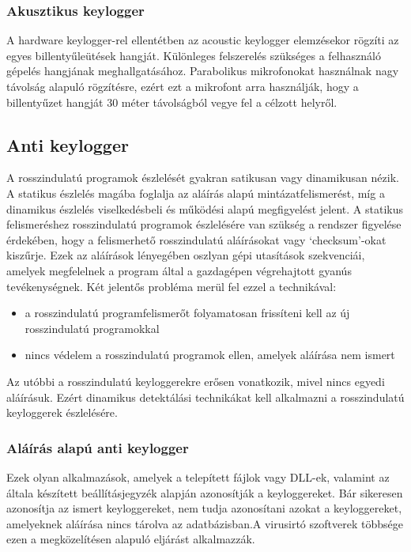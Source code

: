 \documentclass[a4paper, 11pt]{article}
\begin{document}
\subsubsection{Akusztikus keylogger}
\cite{ahmed2014survey} A hardware keylogger-rel ellentétben az acoustic keylogger elemzésekor rögzíti az egyes billentyűleütések hangját. Különleges felszerelés szükséges a felhasználó gépelés hangjának meghallgatásához. Parabolikus mikrofonokat használnak nagy távolság alapuló rögzítésre, ezért ezt a mikrofont arra használják, hogy a billentyűzet hangját 30 méter távolságból vegye fel a célzott helyről.

\subsection{Anti keylogger}
\cite{wood2010keyloggers} A rosszindulatú programok észlelését gyakran satikusan vagy dinamikusan nézik. A statikus észlelés magába foglalja az aláírás alapú mintázatfelismerést, míg a dinamikus észlelés viselkedésbeli és működési alapú megfigyelést jelent. A statikus felismeréshez rosszindulatú programok észlelésére van szükség a rendszer figyelése érdekében, hogy a felismerhető rosszindulatú aláírásokat vagy `checksum'-okat kiszűrje. Ezek az aláírások lényegében oszlyan gépi utasítások szekvenciái, amelyek megfelelnek a program által a gazdagépen végrehajtott gyanús tevékenységnek. Két jelentős probléma merül fel ezzel a technikával:
\begin{itemize}
\item a rosszindulatú programfelismerőt folyamatosan frissíteni kell az új rosszindulatú programokkal
\item nincs védelem a rosszindulatú programok ellen, amelyek aláírása nem ismert
\end{itemize}
Az utóbbi a rosszindulatú keyloggerekre erősen vonatkozik, mivel nincs egyedi aláírásuk. Ezért dinamikus detektálási technikákat kell alkalmazni a rosszindulatú keyloggerek észlelésére.

\subsubsection{Aláírás alapú anti keylogger}
\cite{tuli2013system} Ezek olyan alkalmazások, amelyek a telepített fájlok vagy DLL-ek, valamint az általa készített beállításjegyzék alapján azonosítják a keyloggereket. Bár sikeresen azonosítja az ismert keyloggereket, nem tudja azonosítani azokat a keyloggereket, amelyeknek aláírása nincs tárolva az adatbázisban.A virusirtó szoftverek többsége ezen a megközelítésen alapuló eljárást alkalmazzák.
\end{document}
